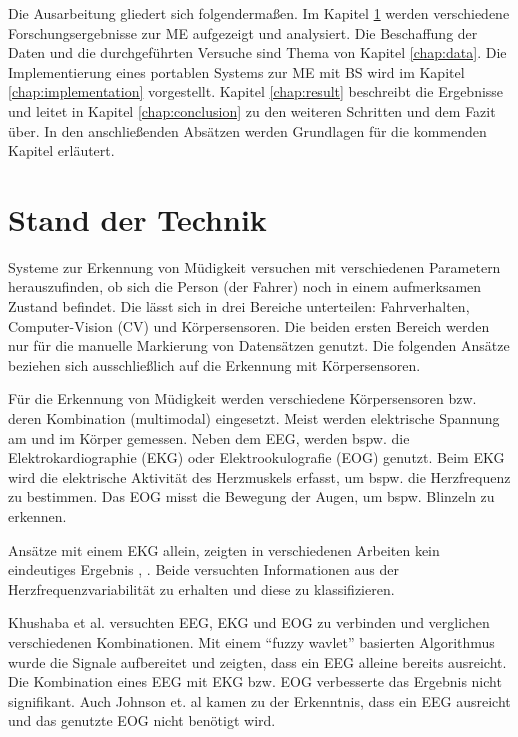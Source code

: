 {Die Ausarbeitung gliedert sich folgendermaßen. Im Kapitel \ref{chap:state} werden verschiedene Forschungsergebnisse zur \acl{ME} aufgezeigt und analysiert. Die Beschaffung der Daten und die durchgeführten Versuche sind  Thema von Kapitel \ref{chap:data}. Die Implementierung eines portablen Systems zur \acl{ME} mit \acl{BS} wird im Kapitel \ref{chap:implementation} vorgestellt. Kapitel \ref{chap:result} beschreibt die Ergebnisse und leitet in Kapitel \ref{chap:conclusion} zu den weiteren Schritten und dem Fazit über. In den anschließenden Absätzen werden Grundlagen für die kommenden Kapitel erläutert.

\section{Stand der Technik}
\label{chap:state}
Systeme zur Erkennung von Müdigkeit versuchen mit verschiedenen Parametern herauszufinden, ob sich die Person (der Fahrer) noch in einem aufmerksamen Zustand befindet. Die lässt sich in drei Bereiche unterteilen: Fahrverhalten, Computer-Vision (CV) und Körpersensoren. Die beiden ersten Bereich werden nur für die manuelle Markierung von Datensätzen genutzt. Die folgenden Ansätze beziehen sich ausschließlich auf die Erkennung mit Körpersensoren.

Für die Erkennung von Müdigkeit werden verschiedene Körpersensoren bzw. deren Kombination (multimodal) eingesetzt. Meist werden elektrische Spannung am und im Körper gemessen. 
Neben dem EEG, werden bspw. die Elektrokardiographie (EKG) oder Elektrookulografie (EOG) genutzt. Beim EKG wird die elektrische Aktivität des Herzmuskels erfasst, um bspw. die  Herzfrequenz zu bestimmen. Das EOG misst die Bewegung der Augen, um bspw. Blinzeln zu erkennen.

Ansätze mit einem EKG allein, zeigten in verschiedenen Arbeiten kein eindeutiges Ergebnis \cite{Vicente_6164509}, \cite{Rogado_4913155}. Beide versuchten Informationen aus der Herzfrequenzvariabilität zu erhalten und diese zu klassifizieren.

Khushaba et al. \cite{Khushaba_5580017} versuchten EEG, EKG und EOG zu verbinden und verglichen verschiedenen Kombinationen. Mit einem "`fuzzy wavlet"' basierten Algorithmus wurde die Signale aufbereitet und zeigten, dass ein EEG alleine bereits ausreicht. Die Kombination eines EEG mit EKG bzw. EOG verbesserte das Ergebnis nicht signifikant. Auch Johnson et. al \cite{Johnson11} kamen zu der Erkenntnis, dass ein EEG ausreicht und das genutzte EOG nicht benötigt wird. 

}
